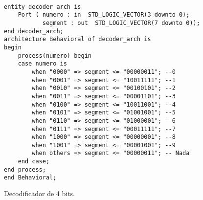 \documentclass[paper=a4, fontsize=12pt]{article}        %
\numberwithin{equation}{section}                        %
\numberwithin{table}{section}                           %
\begin{document}
\begin{listing}[H]
    \begin{verbatim}

entity decoder_arch is
    Port ( numero : in  STD_LOGIC_VECTOR(3 downto 0);
           segment : out  STD_LOGIC_VECTOR(7 downto 0));
end decoder_arch;
architecture Behavioral of decoder_arch is
begin
    process(numero) begin
    case numero is
        when "0000" => segment <= "00000011"; --0
        when "0001" => segment <= "10011111"; --1
        when "0010" => segment <= "00100101"; --2
        when "0011" => segment <= "00001101"; --3
        when "0100" => segment <= "10011001"; --4
        when "0101" => segment <= "01001001"; --5
        when "0110" => segment <= "01000001"; --6
        when "0111" => segment <= "00011111"; --7
        when "1000" => segment <= "00000001"; --8
        when "1001" => segment <= "00001001"; --9
        when others => segment <= "00000011"; -- Nada
    end case;
end process;
end Behavioral;

\end{verbatim}
\caption{Decodificador de 4 bits.}
    \label{decodificador}
\end{listing}
\end{document}
